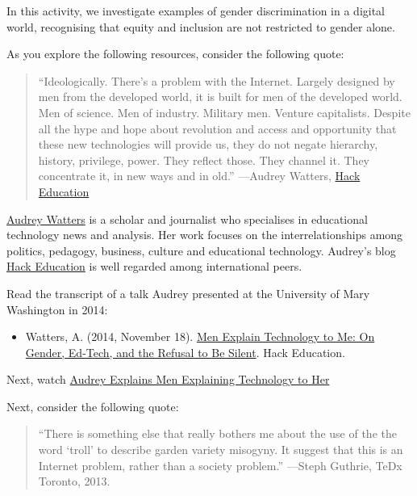 \documentclass[
]{book}
\providecommand{\tightlist}{%
  \setlength{\itemsep}{0pt}\setlength{\parskip}{0pt}}
\theoremstyle{definition}
\theoremstyle{definition}
\theoremstyle{definition}
\theoremstyle{definition}
\theoremstyle{remark}
\begin{document}
\begin{reflect}
In this activity, we investigate examples of gender discrimination in a digital world, recognising that equity and inclusion are not restricted to gender alone.

As you explore the following resources, consider the following quote:

\begin{quote}
``Ideologically. There's a problem with the Internet. Largely designed by men from the developed world, it is built for men of the developed world. Men of science. Men of industry. Military men. Venture capitalists. Despite all the hype and hope about revolution and access and opportunity that these new technologies will provide us, they do not negate hierarchy, history, privilege, power. They reflect those. They channel it. They concentrate it, in new ways and in old.''
---Audrey Watters, \href{http://hackeducation.com/}{Hack Education}
\end{quote}

\href{https://audreywatters.com/}{Audrey Watters} is a scholar and journalist who specialises in educational technology news and analysis. Her work focuses on the interrelationships among politics, pedagogy, business, culture and educational technology. Audrey's blog \href{http://hackeducation.com/}{Hack Education} is well regarded among international peers.

Read the transcript of a talk Audrey presented at the University of Mary Washington in 2014:

\begin{itemize}
\tightlist
\item
  Watters, A. (2014, November 18). \href{http://hackeducation.com/2014/11/18/gender-and-ed-tech}{Men Explain Technology to Me: On Gender, Ed-Tech, and the Refusal to Be Silent}. Hack Education.
\end{itemize}

Next, watch \href{https://www.youtube.com/watch?v=DMjP_p01foo}{Audrey Explains Men Explaining Technology to Her}

Next, consider the following quote:

\begin{quote}
``There is something else that really bothers me about the use of the the word `troll' to describe garden variety misogyny. It suggest that this is an Internet problem, rather than a society problem.''
---Steph Guthrie, TeDx Toronto, 2013.
\end{quote}


\end{reflect}
\end{document}

